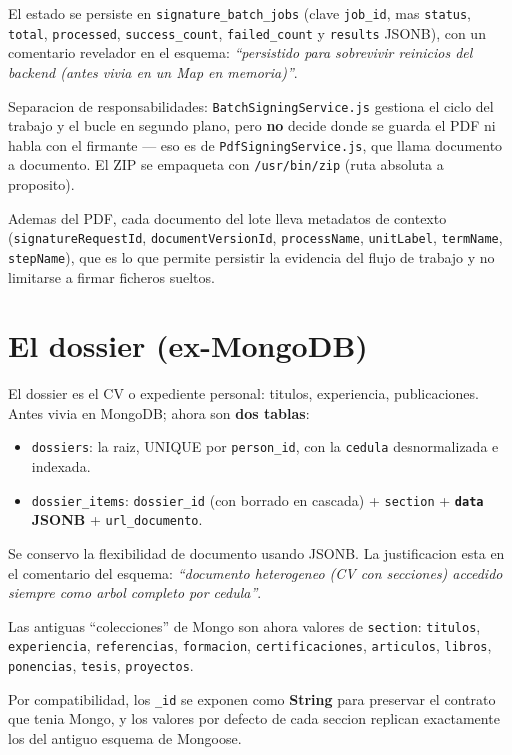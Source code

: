 \documentclass[11pt,a4paper,oneside]{report}
\newcommand{\rt}[1]{\texttt{#1}}
\begin{document}
El estado se persiste en \rt{signature\_batch\_jobs} (clave \rt{job\_id}, mas \rt{status},
\rt{total}, \rt{processed}, \rt{success\_count}, \rt{failed\_count} y \rt{results} JSONB), con
un comentario revelador en el esquema: \emph{``persistido para sobrevivir reinicios del backend
(antes vivia en un Map en memoria)''}.

Separacion de responsabilidades: \rt{BatchSigningService.js} gestiona el ciclo del trabajo y el
bucle en segundo plano, pero \textbf{no} decide donde se guarda el PDF ni habla con el firmante
--- eso es de \rt{PdfSigningService.js}, que llama documento a documento. El ZIP se empaqueta
con \rt{/usr/bin/zip} (ruta absoluta a proposito).

Ademas del PDF, cada documento del lote lleva metadatos de contexto
(\rt{signatureRequestId}, \rt{documentVersionId}, \rt{processName}, \rt{unitLabel},
\rt{termName}, \rt{stepName}), que es lo que permite persistir la evidencia del flujo de
trabajo y no limitarse a firmar ficheros sueltos.

\section{El dossier (ex-MongoDB)}

El dossier es el CV o expediente personal: titulos, experiencia, publicaciones. Antes vivia en
MongoDB; ahora son \textbf{dos tablas}:

\begin{itemize}[leftmargin=1.4em]
  \item \rt{dossiers}: la raiz, UNIQUE por \rt{person\_id}, con la \rt{cedula} desnormalizada e
        indexada.
  \item \rt{dossier\_items}: \rt{dossier\_id} (con borrado en cascada) + \rt{section} +
        \textbf{\rt{data} JSONB} + \rt{url\_documento}.
\end{itemize}

Se conservo la flexibilidad de documento usando JSONB. La justificacion esta en el comentario
del esquema: \emph{``documento heterogeneo (CV con secciones) accedido siempre como arbol
completo por cedula''}.

Las antiguas ``colecciones'' de Mongo son ahora valores de \rt{section}: \rt{titulos},
\rt{experiencia}, \rt{referencias}, \rt{formacion}, \rt{certificaciones}, \rt{articulos},
\rt{libros}, \rt{ponencias}, \rt{tesis}, \rt{proyectos}.

Por compatibilidad, los \rt{\_id} se exponen como \textbf{String} para preservar el contrato
que tenia Mongo, y los valores por defecto de cada seccion replican exactamente los del antiguo
esquema de Mongoose.
\end{document}
